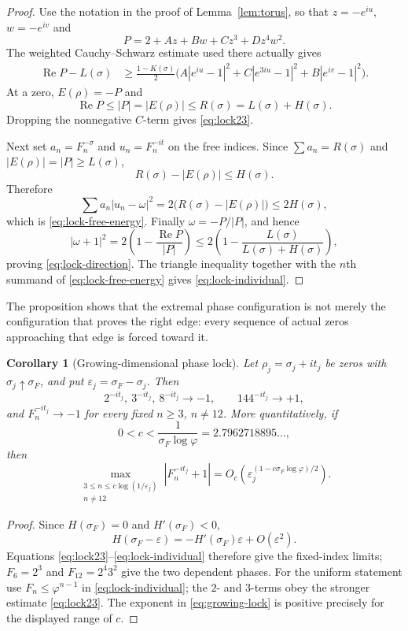 \documentclass[11pt]{article}
\newtheorem{corollary}[theorem]{Corollary}
\theoremstyle{remark}
\newcommand{\Ree}{\operatorname{Re}}
\begin{document}
\begin{proof}
Use the notation in the proof of Lemma~\ref{lem:torus}, so that
$z=-e^{iu}$, $w=-e^{iv}$ and
\[
P=2+Az+Bw+Cz^3+Dz^4w^2.
\]
The weighted Cauchy--Schwarz estimate used there actually gives
\begin{align*}
\Ree P-L(\sigma)
&\ge \frac{1-K(\sigma)}2
\bigl(A|e^{iu}-1|^2+C|e^{3iu}-1|^2+B|e^{iv}-1|^2\bigr).
\end{align*}
At a zero, $E(\rho)=-P$ and
\[
\Ree P\le |P|=|E(\rho)|\le R(\sigma)=L(\sigma)+H(\sigma).
\]
Dropping the nonnegative $C$-term gives \eqref{eq:lock23}.

Next set $a_n=F_n^{-\sigma}$ and $u_n=F_n^{-it}$ on the free indices.  Since
$\sum a_n=R(\sigma)$ and $|E(\rho)|=|P|\ge L(\sigma)$,
\[
R(\sigma)-|E(\rho)|\le H(\sigma).
\]
Therefore
\[
\sum a_n|u_n-\omega|^2
=2\bigl(R(\sigma)-|E(\rho)|\bigr)\le2H(\sigma),
\]
which is \eqref{eq:lock-free-energy}.  Finally $\omega=-P/|P|$, and hence
\[
|\omega+1|^2
=2\left(1-\frac{\Ree P}{|P|}\right)
\le2\left(1-\frac{L(\sigma)}{L(\sigma)+H(\sigma)}\right),
\]
proving \eqref{eq:lock-direction}.  The triangle inequality together with the $n$th summand of \eqref{eq:lock-free-energy} gives \eqref{eq:lock-individual}.
\end{proof}

The proposition shows that the extremal phase configuration is not merely the configuration that proves the right edge: every sequence of actual zeros approaching that edge is forced toward it.

\begin{corollary}[Growing-dimensional phase lock]\label{cor:growing-lock}
Let $\rho_j=\sigma_j+it_j$ be zeros with $\sigma_j\uparrow\sigma_F$, and put $\varepsilon_j=\sigma_F-\sigma_j$.  Then
\[
2^{-it_j},\ 3^{-it_j},\ 8^{-it_j}\longrightarrow-1,
\qquad
144^{-it_j}\longrightarrow+1,
\]
and $F_n^{-it_j}\to-1$ for every fixed $n\ge3$, $n\ne12$.
More quantitatively, if
\[
0<c<\frac1{\sigma_F\log\varphi}=2.7962718895\ldots,
\]
then
\begin{equation}\label{eq:growing-lock}
\max_{\substack{3\le n\le c\log(1/\varepsilon_j)\\n\ne12}}
|F_n^{-it_j}+1|
=O_c\!\left(\varepsilon_j^{(1-c\sigma_F\log\varphi)/2}\right).
\end{equation}
\end{corollary}

\begin{proof}
Since $H(\sigma_F)=0$ and $H'(\sigma_F)<0$,
\[
H(\sigma_F-\varepsilon)=-H'(\sigma_F)\varepsilon+O(\varepsilon^2).
\]
Equations \eqref{eq:lock23}--\eqref{eq:lock-individual} therefore give the fixed-index limits; $F_6=2^3$ and $F_{12}=2^4 3^2$ give the two dependent phases.  For the uniform statement use $F_n\le\varphi^{n-1}$ in \eqref{eq:lock-individual}; the $2$- and $3$-terms obey the stronger estimate \eqref{eq:lock23}.  The exponent in \eqref{eq:growing-lock} is positive precisely for the displayed range of $c$.
\end{proof}
\end{document}
